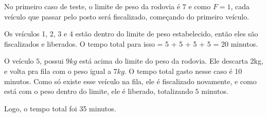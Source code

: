 No primeiro caso de teste, o limite de peso da rodovia é $7$ e como $F=1$, cada veículo que passar pelo posto será fiscalizado, começando do primeiro veículo.

Os veículos 1, 2, 3 e 4 estão dentro do limite de peso estabelecido, então eles são fiscalizados e liberados. O tempo total para isso = 5 + 5 + 5 + 5 = 20 minutos.

O veículo $5$, possui $9kg$ está acima do limite do peso da rodovia. Ele descarta 2kg, e volta pra fila com o peso igual a $7kg$. O tempo total gasto nesse caso é 10 minutos. Como só existe esse veículo na fila, ele é fiscalizado novamente, e como está com o peso dentro do limite, ele é liberado, totalizando $5$ minutos.

Logo, o tempo total foi 35 minutos.


